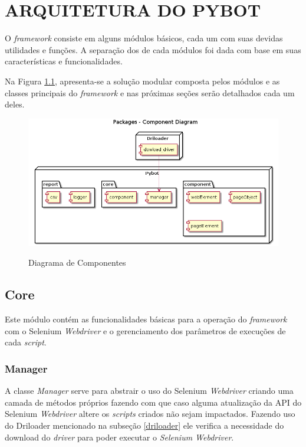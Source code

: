 %
%
\chapter{ARQUITETURA DO PYBOT}\label{chap:imp}
    O \emph{framework} consiste em alguns módulos básicos, cada um com suas devidas utilidades e funções.
    A separação dos de cada módulos foi dada com base em suas características e funcionalidades.

    Na Figura \ref{fig:modules}, apresenta-se a solução modular composta pelos módulos e as classes principais do
    \emph{framework} e nas próximas seções serão detalhados cada um deles.


    \begin{figure}[H]
        \vspace*{0,3cm}
        \centering
        \caption{Diagrama de Componentes}
        \includegraphics[width=1\textwidth]{./04-figuras/model}
        \label{fig:modules}
    \end{figure}
    \vspace*{-0,9cm}
    {\raggedright {}}



    \section{Core}
        Este módulo contém as funcionalidades básicas para a operação do \emph{framework} com o Selenium \emph{Webdriver}
        e o gerenciamento dos parâmetros de execuções de cada \emph{script}.

        \subsection{Manager} \label{sec:manager}
        A classe \emph{Manager} serve para abstrair o uso do Selenium \emph{Webdriver} criando uma camada de métodos próprios fazendo com que caso alguma
        atualização da API do Selenium \emph{Webdriver} altere os \emph{scripts} criados não sejam impactados. Fazendo uso do Driloader mencionado na
        subseção \ref{driloader} ele verifica a necessidade do download do \emph{driver} para poder executar o \emph{Selenium Webdriver}.

